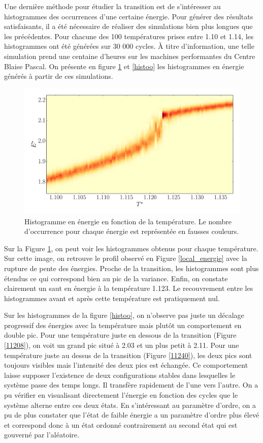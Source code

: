 \documentclass[11pt,a4paper]{article}
\numberwithin{equation}{section}
\begin{document}
Une dernière méthode pour étudier la transition est de s'intéresser au histogrammes des occurrences d'une certaine énergie. Pour générer des résultats satisfaisants, il a été nécessaire de réaliser des simulations bien plus longues que les précédentes. Pour chacune des 100 températures prises entre 1.10 et 1.14, les histogrammes ont été générées sur 30 000 cycles. À titre d'information, une telle simulation prend une centaine d'heures sur les machines performantes du Centre Blaise Pascal. On présente en figure \ref{imagehisto} et \ref{histoo} les histogrammes en énergie générés à partir de ces simulations.

\begin{figure}[h!]
    \centering	    
	\includegraphics[scale=0.5]{figures/histo_image.pdf}
    \caption{Histogramme en énergie en fonction de la température. Le nombre d’occurrence pour chaque énergie est représentée en fausses couleurs.}
    	\label{imagehisto} 
\end{figure}
Sur la Figure \ref{imagehisto}, on peut voir les histogrammes obtenus pour chaque température. Sur cette image, on retrouve le profil observé en Figure \ref{local_energie} avec la rupture de pente des énergies. Proche de la transition, les histogrammes sont plus étendus ce qui correspond bien au pic de la variance. Enfin, on constate clairement un saut en énergie à la température 1.123. Le recouvrement entre les histogrammes avant et après cette température est pratiquement nul.
\medskip

Sur les histogrammes de la figure \ref{histoo}, on n'observe pas juste un décalage progressif des énergies avec la température mais plutôt un comportement en double pic. Pour une température juste en dessous de la transition (Figure \ref{11208}), on voit un grand pic situé à 2.03 et un plus petit à 2.11. Pour une température juste au dessus de la transition (Figure \ref{11240}), les deux pics sont toujours visibles mais l'intensité des deux pics est échangée. Ce comportement laisse supposer l'existence de deux configurations stables dans lesquelles le système passe des temps longs. Il transfère rapidement de l'une vers l'autre. On a pu vérifier en visualisant directement l'énergie en fonction des cycles que le système alterne entre ces deux états. En s'intéressant au paramètre d'ordre, on a pu de plus constater que l'état de faible énergie a un paramètre d'ordre plus élevé et correspond donc à un état ordonné contrairement au second état qui est gouverné par l'aléatoire.
\medskip
\end{document}
